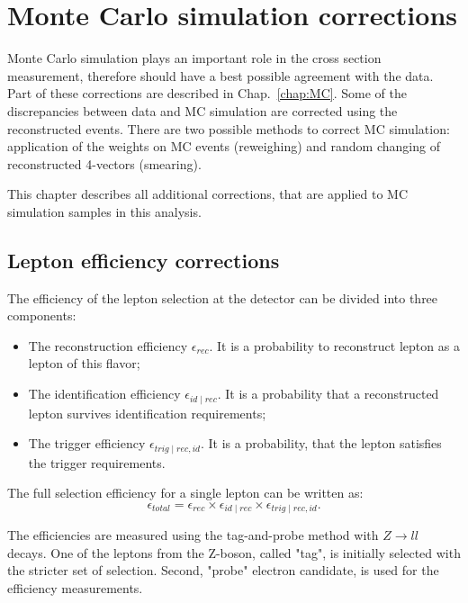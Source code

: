 \chapter{Monte Carlo simulation corrections}\label{chap:MCCor}
\minitoc

Monte Carlo simulation plays an important role in the cross section measurement, therefore should have a best possible agreement with the data. Part of these corrections are described in Chap.~\ref{chap:MC}. Some of the discrepancies between data and MC simulation are corrected using the reconstructed events. There are two possible methods to correct MC simulation: application of the weights on MC events (reweighing) and random changing of reconstructed 4-vectors (smearing).

This chapter describes all additional corrections, that are applied to MC simulation samples in this analysis.

\section{Lepton efficiency corrections}\label{sec:Eff}

The efficiency of the lepton selection at the \atlas detector can be divided into three components:
\begin{itemize}
\item The reconstruction efficiency $\epsilon_{rec}$. It is a probability to reconstruct lepton as a lepton of this flavor;
\item The identification efficiency $\epsilon_{id \mid rec}$. It is a probability that a reconstructed lepton survives  identification requirements;
\item The trigger efficiency $\epsilon_{trig \mid rec,id}$. It is a probability, that the lepton satisfies the trigger requirements. 
\end{itemize}

The full selection efficiency for a single lepton can be written as:
\begin{equation}
\epsilon_{total}=\epsilon_{rec} \times \epsilon_{id \mid rec} \times \epsilon_{trig \mid rec,id}.
\end{equation}

The efficiencies are measured using the tag-and-probe method with $Z\to ll$ decays.  One of the leptons from the Z-boson, called "tag", is initially selected with the stricter set of selection. Second, "probe" electron candidate, is used for the efficiency measurements.

